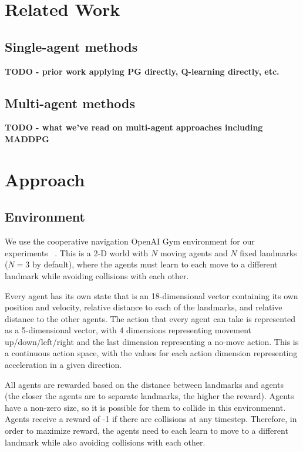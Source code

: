 \documentclass{article}
\begin{document}
\section{Related Work}
\subsection{Single-agent methods}
\textbf{TODO - prior work applying PG directly, Q-learning directly, etc.}

\subsection{Multi-agent methods}
\textbf{TODO - what we've read on multi-agent approaches including MADDPG}

\section{Approach}

\subsection{Environment}

We use the cooperative navigation OpenAI Gym environment for our experiments ~\cite{openaigym}. This is a 2-D world with $N$ moving agents and $N$ fixed landmarks ($N=3$ by default), where the agents must learn to each move to a different landmark while avoiding collisions with each other.

Every agent has its own state that is an 18-dimensional vector containing its own position and velocity, relative distance to each of the landmarks, and relative distance to the other agents. The action that every agent can take is represented as a 5-dimensional vector, with 4 dimensions representing movement up/down/left/right and the last dimension representing a no-move action. This is a continuous action space, with the values for each action dimension representing acceleration in a given direction.

All agents are rewarded based on the distance between landmarks and agents (the closer the agents are to separate landmarks, the higher the reward). Agents have a non-zero size, so it is possible for them to collide in this environmennt. Agents receive a reward of -1 if there are collisions at any timestep. Therefore, in order to maximize reward, the agents need to each learn to move to a different landmark while also avoiding collisions with each other.
\end{document}
